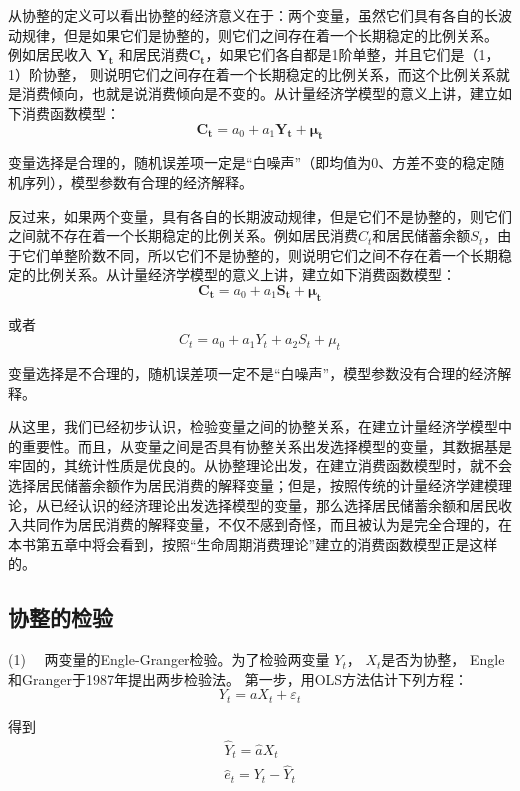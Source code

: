 		从协整的定义可以看出协整的经济意义在于：两个变量，虽然它们具有各自的长波动规律，但是如果它们是协整的，则它们之间存在着一个长期稳定的比例关系。
		例如居民收入 $ \boldsymbol{Y_{t}} $ 和居民消费$ \boldsymbol{C_{t}} $，如果它们各自都是1阶单整，并且它们是（1，1）阶协整，
		则说明它们之间存在着一个长期稳定的比例关系，而这个比例关系就是消费倾向，也就是说消费倾向是不变的。从计量经济学模型的意义上讲，建立如下消费函数模型：
		$$ \boldsymbol{C_{t}} =a_{0}+a_{1} \boldsymbol{Y_{t}} + \boldsymbol{\mu_{t}} $$
		
		变量选择是合理的，随机误差项一定是“白噪声”（即均值为0、方差不变的稳定随机序列），模型参数有合理的经济解释。
		
		反过来，如果两个变量，具有各自的长期波动规律，但是它们不是协整的，则它们之间就不存在着一个长期稳定的比例关系。例如居民消费$ C_{t} $和居民储蓄余额$ S_{t} $，由于它们单整阶数不同，所以它们不是协整的，则说明它们之间不存在着一个长期稳定的比例关系。从计量经济学模型的意义上讲，建立如下消费函数模型：
		$$ \boldsymbol{C_{t}} = a_{0}+a_{1} \boldsymbol{S_{t}} + \boldsymbol{\mu_{t}} $$
		
		或者
		$$ C_{t}=a_{0}+a_{1} Y_{t}+a_{2} S_{t}+\mu_{t} $$
		
		变量选择是不合理的，随机误差项一定不是“白噪声”，模型参数没有合理的经济解释。
		
		从这里，我们已经初步认识，检验变量之间的协整关系，在建立计量经济学模型中的重要性。而且，从变量之间是否具有协整关系出发选择模型的变量，其数据基是牢固的，其统计性质是优良的。从协整理论出发，在建立消费函数模型时，就不会选择居民储蓄余额作为居民消费的解释变量；但是，按照传统的计量经济学建模理论，从已经认识的经济理论出发选择模型的变量，那么选择居民储蓄余额和居民收入共同作为居民消费的解释变量，不仅不感到奇怪，而且被认为是完全合理的，在本书第五章中将会看到，按照“生命周期消费理论”建立的消费函数模型正是这样的。
		
	\subsection{协整的检验}	
	
		(1) \ \ 两变量的Engle-Granger检验。为了检验两变量 $ Y_{t} $， $ X_{t} $是否为协整，
		Engle和Granger于1987年提出两步检验法。
		第一步，用OLS方法估计下列方程：
		\vspace{-0.5em}
		$$ Y_{t}=a X_{t}+\varepsilon_{t} $$
		
		得到 $$
		\begin{array}{l}
		\hat{Y}_{t}=\hat{a} X_{t} \\
		\hat{e}_{t}=Y_{t}-\hat{Y}_{t}
		\end{array} $$ 
		
